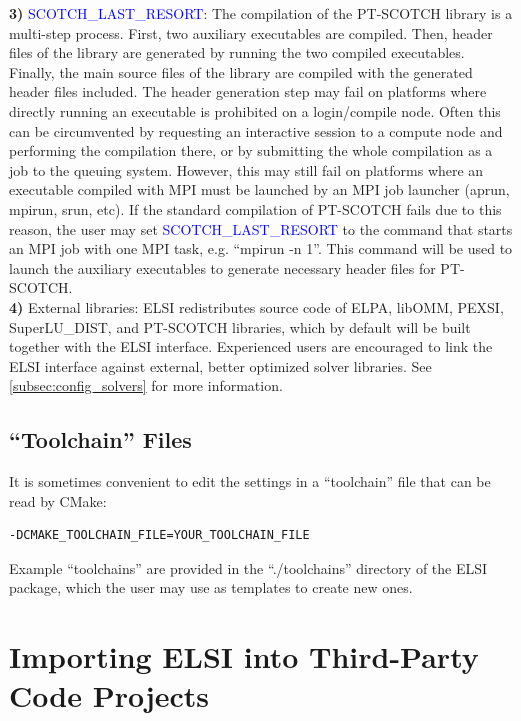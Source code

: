 \documentclass{report}
\begin{document}
\textbf{3)} \textcolor{blue}{SCOTCH\_LAST\_RESORT}:  The compilation of the PT-SCOTCH library is a multi-step process.  First, two auxiliary executables are compiled.  Then, header files of the library are generated by running the two compiled executables.  Finally, the main source files of the library are compiled with the generated header files included.  The header generation step may fail on platforms where directly running an executable is prohibited on a login/compile node.  Often this can be circumvented by requesting an interactive session to a compute node and performing the compilation there, or by submitting the whole compilation as a job to the queuing system.  However, this may still fail on platforms where an executable compiled with MPI must be launched by an MPI job launcher (aprun, mpirun, srun, etc).  If the standard compilation of PT-SCOTCH fails due to this reason, the user may set \textcolor{blue}{SCOTCH\_LAST\_RESORT} to the command that starts an MPI job with one MPI task, e.g. ``mpirun -n 1''.  This command will be used to launch the auxiliary executables to generate necessary header files for PT-SCOTCH.\\

\textbf{4)} External libraries:  ELSI redistributes source code of ELPA, libOMM, PEXSI, SuperLU\_DIST, and PT-SCOTCH libraries, which by default will be built together with the ELSI interface.  Experienced users are encouraged to link the ELSI interface against external, better optimized solver libraries.  See \ref{subsec:config_solvers} for more information.\\

\subsection{``Toolchain'' Files}
\label{subsec:config_toolchain}
It is sometimes convenient to edit the settings in a ``toolchain'' file that can be read by CMake:\\

\begin{verbatim}
-DCMAKE_TOOLCHAIN_FILE=YOUR_TOOLCHAIN_FILE
\end{verbatim}

Example ``toolchains'' are provided in the ``./toolchains'' directory of the ELSI package, which the user may use as templates to create new ones.\\

\section{Importing ELSI into Third-Party Code Projects}
\label{sec:import}
\end{document}
